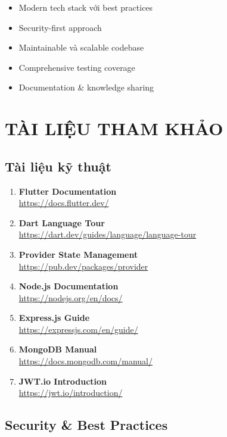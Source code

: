 \documentclass[12pt,a4paper]{article}
\begin{document}
\begin{itemize}
    \item Modern tech stack với best practices
    \item Security-first approach
    \item Maintainable và scalable codebase
    \item Comprehensive testing coverage
    \item Documentation \& knowledge sharing
\end{itemize}

\section{TÀI LIỆU THAM KHẢO}

\subsection{Tài liệu kỹ thuật}

\begin{enumerate}
    \item \textbf{Flutter Documentation} \\
          \url{https://docs.flutter.dev/}
    \item \textbf{Dart Language Tour} \\
          \url{https://dart.dev/guides/language/language-tour}
    \item \textbf{Provider State Management} \\
          \url{https://pub.dev/packages/provider}
    \item \textbf{Node.js Documentation} \\
          \url{https://nodejs.org/en/docs/}
    \item \textbf{Express.js Guide} \\
          \url{https://expressjs.com/en/guide/}
    \item \textbf{MongoDB Manual} \\
          \url{https://docs.mongodb.com/manual/}
    \item \textbf{JWT.io Introduction} \\
          \url{https://jwt.io/introduction/}
\end{enumerate}

\subsection{Security \& Best Practices}
\end{document}
